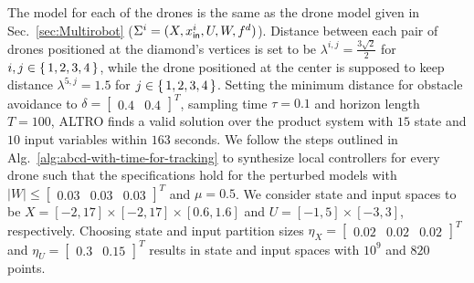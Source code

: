 The model for each of the drones is the same as the drone model given in Sec.~\ref{sec:Multirobot} ($\Sigma^i=(X,x_{\mathsf{in}}^i,U,W,f^d)$). Distance between each pair of drones positioned at the diamond's vertices is set to be $\lambda^{i,j}=\frac{3\sqrt{2}}{2}$ for $i,j\in\set{1,2,3,4}$, while the drone positioned at the center is supposed to keep distance $\lambda^{5,j}=1.5$ for $j\in\set{1,2,3,4}$. Setting the minimum distance for obstacle avoidance to $\delta=\begin{bmatrix}0.4&0.4\end{bmatrix}^T$, sampling time $\tau=0.1$ and horizon length $T=100$, ALTRO finds a valid solution over the product system with $15$ state and $10$ input variables within $163$ seconds.
We follow the steps outlined in Alg.~\ref{alg:abcd-with-time-for-tracking} to synthesize local controllers for every drone such that the specifications hold for the perturbed models with $|W|\leq \begin{bmatrix}0.03&0.03&0.03\end{bmatrix}^T$ and $\mu=0.5$. %
We consider state and input spaces to be $X=[-2,17]\times[-2,17]\times[0.6,1.6]$ and
$U=[-1,5]\times[-3,3]$, respectively. Choosing state and input partition sizes $\eta_{X}=\begin{bmatrix}0.02&0.02&0.02\end{bmatrix}^T$ and
$\eta_{U}=\begin{bmatrix}0.3&0.15\end{bmatrix}^T$ results in state and input spaces with $10^9$ and $820$ points. 
